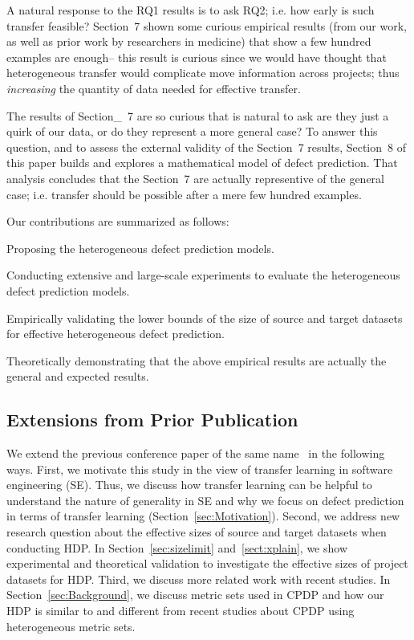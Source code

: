 A natural response to the RQ1 results is to ask RQ2; i.e. how early is such transfer
feasible?  Section~7 shown some curious empirical results (from our
work, as well as prior work by researchers in medicine) that show a few hundred examples are enough-- this result is curious since we would have thought that
heterogeneous transfer would complicate move information across projects;
thus {\em increasing} the quantity of data needed for effective transfer.

The results of Section_~7 are so curious that is natural to ask are they just a quirk of our data, or do they represent a more general case? To answer this question, and to assess the external validity of the Section~7 results, Section~8 of this paper builds and explores a mathematical model of defect prediction.
That analysis concludes that the Section~7 are actually representive of the general case; i.e. transfer should be possible after a mere few hundred examples. 



Our contributions are summarized as follows:
\squishlist
  \item Proposing the heterogeneous defect prediction models.
  \item Conducting extensive and large-scale experiments to evaluate
  the heterogeneous defect prediction models.
  \item Empirically validating the lower bounds of the size of source and target datasets for effective heterogeneous defect prediction.
  \item Theoretically demonstrating that the above empirical results are actually
  the general and expected results.
\squishend


\subsection{Extensions from Prior Publication}

We extend the previous conference paper of the same name~\cite{Nam15HDP} in the following ways. First, we motivate this study in the view of transfer learning in software engineering (SE). Thus, we discuss how transfer learning can be helpful to understand the nature of generality in SE and why we focus on defect prediction in terms of transfer learning (Section~\ref{sec:Motivation}). Second, we address new research question about the effective sizes of source and target datasets when conducting HDP.  In Section~\ref{sec:sizelimit} and~\ref{sect:xplain}, we show experimental and theoretical validation to investigate the effective sizes of project datasets for HDP. Third, we discuss more related work with recent studies. In Section~\ref{sec:Background}, we discuss metric sets used in CPDP and how our HDP is similar to and different from recent studies about CPDP using heterogeneous metric sets.

